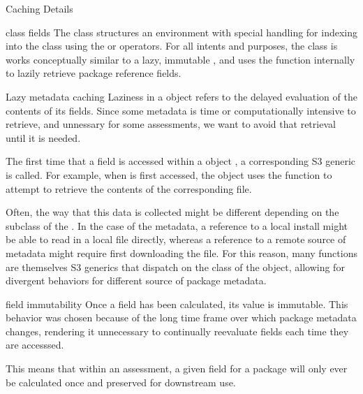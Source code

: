 \documentclass[a4paper]{book}
\begin{document}
\begin{Section}{Caching Details}

%
\begin{SubSection}{ class fields}
The  class structures an environment with special handling
for indexing into the  class using the \code{\$} or \code{[[}
operators. For all intents and purposes, the  class is works
conceptually similar to a lazy, immutable , and uses the
 function internally to lazily retrieve package
reference fields.
\end{SubSection}

%
\begin{SubSection}{Lazy metadata caching}
Laziness in a  object refers to the delayed evaluation of the
contents of its fields. Since some metadata is time or computationally
intensive to retrieve, and unnessary for some assessments, we want to avoid
that retrieval until it is needed.

The first time that a field is accessed within a  object
, a corresponding  S3 generic is called. For
example, when  is first accessed, the 
object uses the function  to attempt to
retrieve the contents of the corresponding  file.

Often, the way that this data is collected might be different depending on
the subclass of the . In the case of the 
metadata, a reference to a local install might be able to read in a local
file directly, whereas a reference to a remote source of metadata might
require first downloading the file. For this reason, many
 functions are themselves S3 generics that dispatch
on the class of the  object, allowing for divergent behaviors
for different source of package metadata.
\end{SubSection}

%
\begin{SubSection}{ field immutability}
Once a field has been calculated, its value is immutable. This behavior was
chosen because of the long time frame over which package metadata changes,
rendering it unnecessary to continually reevaluate fields each time they
are accesssed.

This means that within an assessment, a given field for a package will only
ever be calculated once and preserved for downstream use.
\end{SubSection}

\end{Section}
\end{document}
